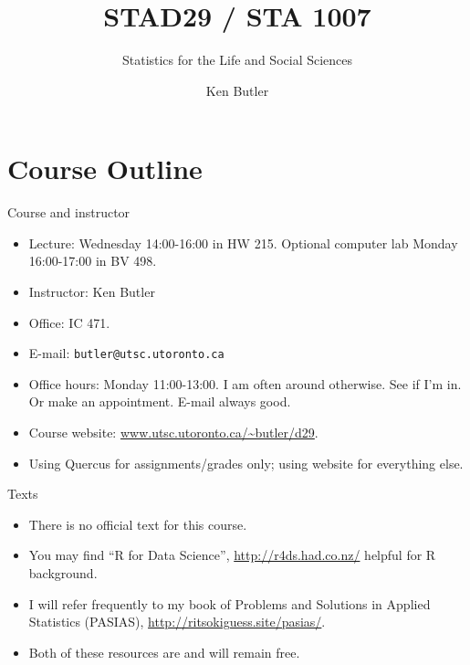 \documentclass[unknownkeysallowed]{beamer}\usepackage[]{graphicx}\usepackage[]{color}
\title{STAD29 / STA 1007}
\subtitle{Statistics for the Life and Social Sciences}
\author{Ken Butler}
\begin{document}
\maketitle


\section*{Course Outline}
\frame{\sectionpage}

\begin{frame}[fragile]{Course and instructor}
  \begin{itemize}
    \item  Lecture: Wednesday 14:00-16:00 in HW 215. Optional computer
      lab Monday 16:00-17:00 in BV 498.
    \item  Instructor: Ken Butler
    \item  Office: IC 471.
    \item  E-mail: \verb-butler@utsc.utoronto.ca-
    \item Office hours: Monday 11:00-13:00. I am often around
      otherwise. See if I'm in. Or make an appointment. E-mail always
      good.
    \item Course website: 
\url{www.utsc.utoronto.ca/~butler/d29}.
    \item Using Quercus for assignments/grades only; using website for
      everything else.
\end{itemize}

\end{frame}

\begin{frame}[fragile]{Texts}

\begin{itemize}
\item There is no official text for this course. 
\item You may find ``R for Data Science'', 
  \url{http://r4ds.had.co.nz/} helpful for R background.
\item I will refer frequently to my book of Problems and Solutions in Applied Statistics (PASIAS), \url{http://ritsokiguess.site/pasias/}.
\item Both of these resources are and will remain free.
\end{itemize}
  
\end{frame}
\end{document}
